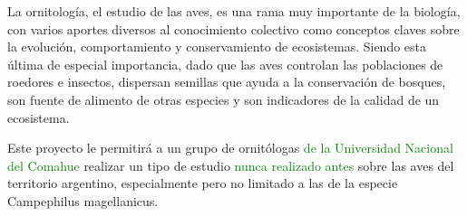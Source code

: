 



La ornitología, el estudio de las aves, es una rama muy importante de la biología, con varios aportes diversos al conocimiento colectivo como conceptos claves sobre la evolución, comportamiento y conservamiento de ecosistemas. Siendo esta última de especial importancia, dado que las aves controlan las poblaciones de roedores e insectos, dispersan semillas que ayuda a la conservación de bosques, son fuente de alimento de otras especies y son indicadores de la calidad de un ecosistema.

Este proyecto le permitirá a un grupo de ornitólogas \textcolor{green}{de la Universidad Nacional del Comahue} realizar un tipo de estudio \textcolor{green}{nunca realizado antes} sobre las aves del territorio argentino, especialmente pero no limitado a las de la especie Campephilus magellanicus.



